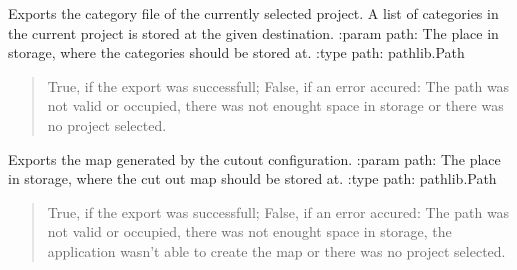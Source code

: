 \documentclass[letterpaper,10pt,english]{sphinxmanual}
\begin{document}
\begin{fulllineitems}
\begin{fulllineitems}
\label{\detokenize{apidoc/src.osm_configurator.control:src.osm_configurator.control.export_controller.ExportController.export_configurations}}
\pysigstartsignatures
{}
\pysigstopsignatures
\sphinxAtStartPar
Exports the category file of the currently selected project.
A list of categories in the current project is stored at the given destination.
:param path: The place in storage, where the categories should be stored at.
:type path: pathlib.Path
\begin{quote}\begin{description}
\sphinxAtStartPar
True, if the export was successfull; False, if an error accured: The path was not valid or occupied, there was not enought space in storage or there was no project selected.

\sphinxAtStartPar
{}

\end{description}\end{quote}

\end{fulllineitems}


\begin{fulllineitems}
\label{\detokenize{apidoc/src.osm_configurator.control:src.osm_configurator.control.export_controller.ExportController.export_cut_out_map}}
\pysigstartsignatures
{}
\pysigstopsignatures
\sphinxAtStartPar
Exports the map generated by the cut\sphinxhyphen{}out configuration.
:param path: The place in storage, where the cut out map should be stored at.
:type path: pathlib.Path
\begin{quote}\begin{description}
\sphinxAtStartPar
True, if the export was successfull; False, if an error accured: The path was not valid or occupied, there was not enought space in storage, the application wasn’t able to create the map or there was no project selected.

\sphinxAtStartPar
{}

\end{description}\end{quote}

\end{fulllineitems}


\end{fulllineitems}
\end{document}
